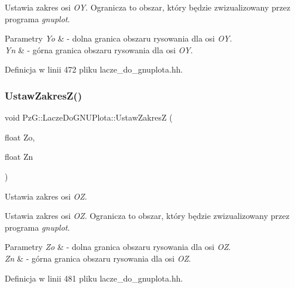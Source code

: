 Ustawia zakres osi {\itshape OY}. Ogranicza to obszar, który będzie zwizualizowany przez programa {\itshape gnuplot}. 
\begin{DoxyParams}{Parametry}
{\em Yo} & -\/ dolna granica obszaru rysowania dla osi {\itshape OY}. \\
\hline
{\em Yn} & -\/ górna granica obszaru rysowania dla osi {\itshape OY}. \\
\hline
\end{DoxyParams}


Definicja w linii 472 pliku lacze\+\_\+do\+\_\+gnuplota.\+hh.

\mbox{\label{class_pz_g_1_1_lacze_do_g_n_u_plota_a1dbbb2b86fb13b8632e6bad9df2a82e3}} 
\subsubsection{\texorpdfstring{Ustaw\+Zakres\+Z()}{UstawZakresZ()}}
{\footnotesize\ttfamily void Pz\+G\+::\+Lacze\+Do\+G\+N\+U\+Plota\+::\+Ustaw\+ZakresZ (\begin{DoxyParamCaption}\item[{float}]{Zo,  }\item[{float}]{Zn }\end{DoxyParamCaption})\hspace{0.3cm}{\ttfamily [inline]}}



Ustawia zakres osi {\itshape OZ}. 

Ustawia zakres osi {\itshape OZ}. Ogranicza to obszar, który będzie zwizualizowany przez programa {\itshape gnuplot}. 
\begin{DoxyParams}{Parametry}
{\em Zo} & -\/ dolna granica obszaru rysowania dla osi {\itshape OZ}. \\
\hline
{\em Zn} & -\/ górna granica obszaru rysowania dla osi {\itshape OZ}. \\
\hline
\end{DoxyParams}


Definicja w linii 481 pliku lacze\+\_\+do\+\_\+gnuplota.\+hh.

\mbox{\label{class_pz_g_1_1_lacze_do_g_n_u_plota_a75f599f17413ea8602c6dbba09f36407}} 
